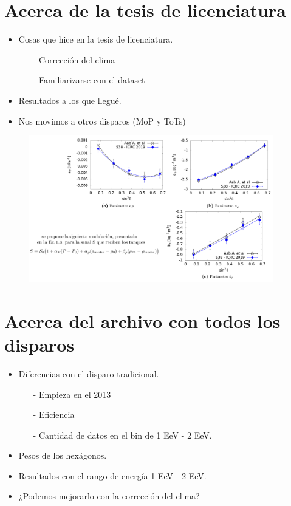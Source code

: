 \section{Acerca de la tesis de licenciatura}

  \begin{itemize}
    \item Cosas que hice en la tesis de licenciatura.
    \begin{itemize}
    	\item[-] Corrección del clima
    	\item[-] Familiarizarse con el dataset
    \end{itemize}
    \item Resultados a los que llegué.
    \item Nos movimos a otros disparos (MoP y ToTs)
  \end{itemize}
  
   
  \begin{figure}[htbp]
    \centering
    \includegraphics[width=0.95\textwidth]{../beamer-07-05-2020/tesis.png}
  \end{figure}
  
\section{Acerca del archivo con todos los disparos}

  \begin{itemize}
  	\item Diferencias con el disparo tradicional.
    \begin{itemize}
      \item[-] Empieza en el 2013
      \item[-] Eficiencia
      \item[-] Cantidad de datos en el bin de 1 EeV - 2 EeV.
    \end{itemize}
  	\item Pesos de los hexágonos.
  	\item Resultados con el rango de energía 1 EeV - 2 EeV.
    \item ¿Podemos mejorarlo con la corrección del clima?
  \end{itemize}

